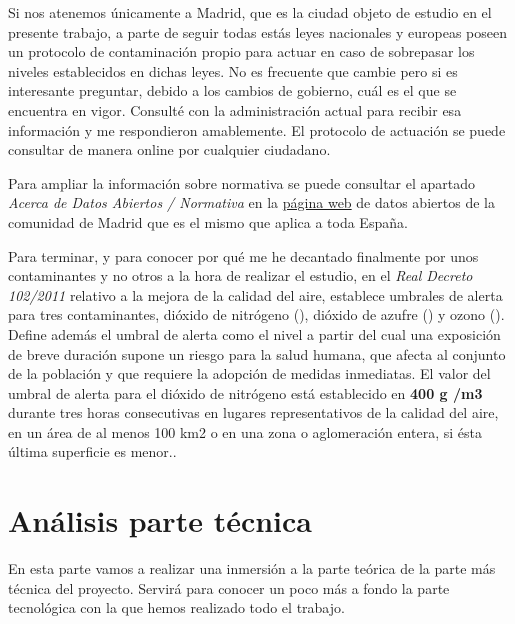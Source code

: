 Si nos atenemos únicamente a Madrid, que es la ciudad objeto de estudio en el presente trabajo, a parte de seguir todas estás leyes nacionales y europeas poseen un protocolo de contaminación propio para actuar en caso de sobrepasar los niveles establecidos en dichas leyes. No es frecuente que cambie pero si es interesante preguntar, debido a los cambios de gobierno, cuál es el que se encuentra en vigor. Consulté con la administración actual para recibir esa información y me respondieron amablemente. El protocolo de actuación se puede consultar de manera online \cite{ley_protocolo_madrid} por cualquier ciudadano.


Para ampliar la información sobre normativa se puede consultar el apartado \textit{Acerca de Datos Abiertos / Normativa} en la \href{https://datos.madrid.es/portal/site/egob/menuitem.400a817358ce98c34e937436a8a409a0/?vgnextoid=830512b9ace9f310VgnVCM100000171f5a0aRCRD&vgnextchannel=830512b9ace9f310VgnVCM100000171f5a0aRCRD&vgnextfmt=default}{página web} de datos abiertos de la comunidad de Madrid que es el mismo que aplica a toda España.

Para terminar, y para conocer por qué me he decantado finalmente por unos contaminantes y no otros a la hora de realizar el estudio, en el \textit{Real Decreto 102/2011} relativo a la mejora de la calidad del aire, establece umbrales de alerta para tres contaminantes,  dióxido de nitrógeno (), dióxido de azufre () y ozono (). Define además el umbral de alerta como el nivel a partir del cual una exposición de breve duración supone un riesgo para la salud humana, que afecta al conjunto de la población y que requiere la adopción de medidas inmediatas. El valor del umbral de alerta para el dióxido de nitrógeno está establecido en \textbf{400 \textmugreek g /m3} durante tres horas consecutivas en lugares representativos de la calidad del aire, en un área de al menos 100 km2 o en una zona o aglomeración entera, si ésta última superficie es menor..

\section{Análisis parte técnica}\label{teorico-tecnico}

En esta parte vamos a realizar una inmersión a la parte teórica de la parte más técnica del proyecto. Servirá para conocer un poco más a fondo la parte tecnológica con la que hemos realizado todo el trabajo.

